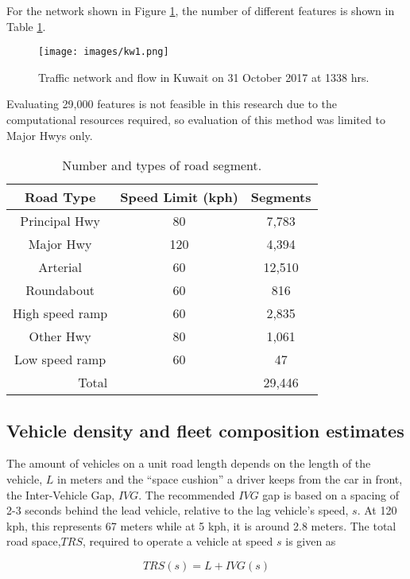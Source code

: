 For the network shown in Figure \ref{fig:kwtraffic}, the number of different features is shown in Table \ref{tb:roadsegments}.
%
\begin{figure}
\texttt{[image: images/kw1.png]} 
\caption[Traffic network and flow in Kuwait]{Traffic network and flow in Kuwait on 31 October 2017 at 1338 hrs.}
\label{fig:kwtraffic}
\end{figure}
%
Evaluating 29,000 features is not feasible in this research due to the computational resources required, so evaluation of this method was limited to Major Hwys only.
%
\begin{table}[]
\centering
\caption{Number and types of road segment.}
\label{tb:roadsegments}
\begin{tabular}{@{}ccc@{}}
\toprule
\textbf{Road Type} & \textbf{Speed Limit (kph)} & \textbf{Segments} \\ \midrule
Principal Hwy & 80 & 7,783 \\
Major Hwy & 120 & 4,394 \\
Arterial & 60 & 12,510 \\
Roundabout & 60 & 816 \\
High speed ramp & 60 & 2,835 \\
Other Hwy & 80 & 1,061 \\
Low speed ramp & 60 & 47 \\
\multicolumn{1}{r}{Total} &  & 29,446 \\ \bottomrule
\end{tabular}
\end{table}
%

\subsection{Vehicle density and fleet composition estimates}
The amount of vehicles on a unit road length depends on the length of the vehicle, $L$ in meters and the ``space cushion” a driver keeps from the car in front, the Inter-Vehicle Gap, $IVG$.  The recommended $IVG$ gap is based on a spacing of 2-3 seconds \citep{NYDMV2015} behind the lead vehicle, relative to the lag vehicle's speed, $s$.  At 120 kph, this represents 67 meters while at 5 kph, it is around 2.8 meters.  The total road space,$TRS$, required to operate a vehicle at speed $s$ is given as

\begin{equation}
\label{eq:roadspace}
TRS(s)=L + IVG(s)
\end{equation}

